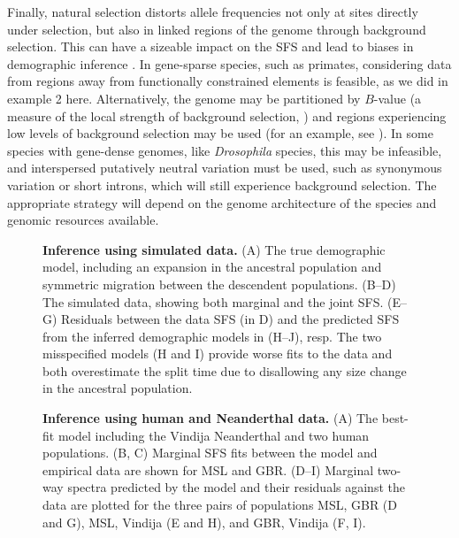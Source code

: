 \documentclass[]{article}
\begin{document}
Finally, natural selection distorts allele frequencies not only at sites
directly under selection, but also in linked regions of the genome through
background selection. This can have a sizeable impact on the SFS and lead to
biases in demographic inference \cite{ewing2016consequences, johri2021impact}.
In gene-sparse species, such as primates, considering data from regions away
from functionally constrained elements is feasible, as we did in example 2
here. Alternatively, the genome may be partitioned by $B$-value (a measure of
the local strength of background selection, \cite{mcvicker2009widespread}) and
regions experiencing low levels of background selection may be used (for an
example, see \cite{medina2023demographic}). In some species with gene-dense
genomes, like \emph{Drosophila} species, this may be infeasible, and
interspersed putatively neutral variation must be used, such as synonymous
variation or short introns, which will still experience background selection.
The appropriate strategy will depend on the genome architecture of the species
and genomic resources available.





\clearpage

\begin{figure}
    \caption{
        \textbf{Inference using simulated data.}
        (A) The true demographic model, including an expansion in the ancestral
        population and symmetric migration between the descendent populations.
        (B--D) The simulated data, showing both marginal and the joint SFS.
        (E--G) Residuals between the data SFS (in D) and the predicted SFS from
        the inferred demographic models in (H--J), resp. The two misspecified
        models (H and I) provide worse fits to the data and both overestimate
        the split time due to disallowing any size change in the ancestral
        population.
    }
    \label{fig:im}
\end{figure}

\begin{figure}
    \caption{
        \textbf{Inference using human and Neanderthal data.}
        (A) The best-fit model including the Vindija Neanderthal and two human
        populations.
        (B, C) Marginal SFS fits between the model and empirical data are shown
        for MSL and GBR.
        (D--I) Marginal two-way spectra predicted by the model and their residuals 
        against the data are plotted for the three pairs of populations MSL, GBR 
        (D and G), MSL, Vindija (E and H), and GBR, Vindija (F, I).
    }
    \label{fig:humans}
\end{figure}
\end{document}
